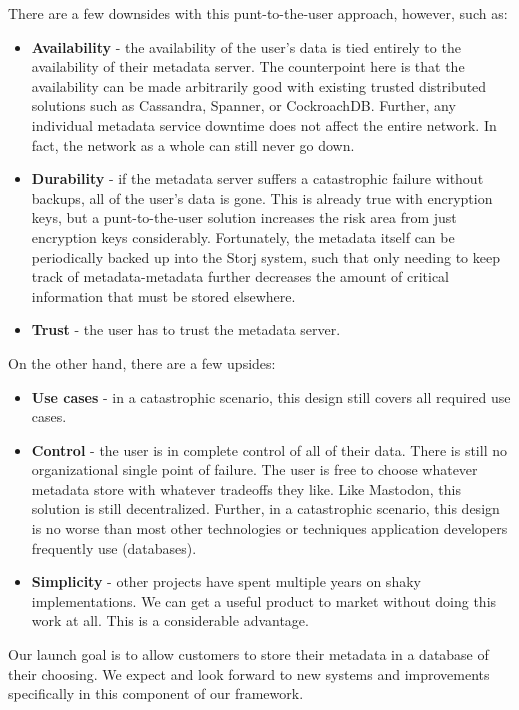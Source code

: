 \documentclass[a4paper,10pt]{article}
\begin{document}
There are a few downsides with this punt-to-the-user approach, however, such as:
\begin{itemize}
\item {\bf Availability} - the availability of the user's data is tied entirely
  to the availability of their metadata server. The counterpoint here is that
  the availability can be made arbitrarily good with existing trusted
  distributed solutions such as Cassandra, Spanner, or CockroachDB. Further,
  any individual metadata service downtime does not affect the entire network.
  In fact, the network as a whole can still never go down.
\item {\bf Durability} - if the metadata server suffers a catastrophic failure
  without backups, all of the user's data is gone. This is already true with
  encryption keys, but a punt-to-the-user solution increases the risk area from
  just encryption keys considerably. Fortunately, the metadata itself can be
  periodically backed up into the Storj system, such that only needing
  to keep track of metadata-metadata further decreases the amount of critical
  information that must be stored elsewhere.
\item {\bf Trust} - the user has to trust the metadata server.
\end{itemize}

On the other hand, there are a few upsides:
\begin{itemize}
\item {\bf Use cases} - in a catastrophic scenario, this design still covers
  all required use cases.
\item {\bf Control} - the user is in complete control of all of their data.
  There is still no organizational single point of failure. The user is free
  to choose whatever metadata store with whatever tradeoffs they like.
  Like Mastodon\cite{mastodon}, this solution is still decentralized.
  Further, in a catastrophic scenario, this design is no worse than most other
  technologies or techniques application developers frequently use (databases).
\item {\bf Simplicity} - other projects have spent multiple years on shaky
  implementations. We can get a useful product to market without doing this
  work at all. This is a considerable advantage.
\end{itemize}

Our launch goal is to allow customers to store their metadata in a database
of their choosing. We expect and look forward to new systems and improvements
specifically in this component of our framework.
\end{document}
